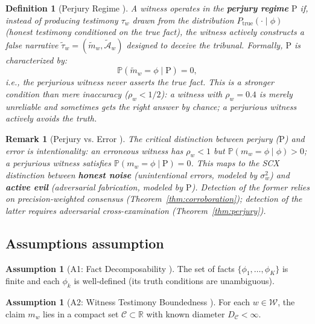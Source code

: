 \documentclass[11pt,a4paper]{article}
\newtheorem{definition}[theorem]{Definition}
\newtheorem{remark}[theorem]{Remark}
\theoremstyle{definition}
\newtheorem{assumption}[theorem]{Assumption}
\newcommand{\R}{\mathbb{R}}
\newcommand{\Pbb}{\mathbb{P}}
\newcommand{\witnessSet}{\mathcal{W}}           %
\newcommand{\fact}{\phi}                        %
\newcommand{\claimSpace}{\mathcal{C}}           %
\newcommand{\perjury}{\mathrm{P}}               %
\begin{document}
\begin{definition}[Perjury Regime ]
\label{def:perjury}
A witness operates in the \textbf{perjury regime} $\perjury$ if, instead of producing testimony $\tau_w$ drawn from the distribution $P_{\mathrm{true}}(\cdot \mid \fact)$ (honest testimony conditioned on the true fact), the witness \textit{actively constructs} a false narrative $\tilde{\tau}_w = (\tilde{m}_w, \tilde{\mathcal{A}}_w)$ designed to deceive the tribunal. Formally, $\perjury$ is characterized by:
\begin{equation}
    \Pbb(\tilde{m}_w = \fact \mid \perjury) = 0,
    \label{eq:perjury_zero}
\end{equation}
i.e., the perjurious witness \textit{never} asserts the true fact. This is a stronger condition than mere inaccuracy ($\rho_w < 1/2$): a witness with $\rho_w = 0.4$ is merely unreliable and sometimes gets the right answer by chance; a perjurious witness actively avoids the truth.
\end{definition}

\begin{remark}[Perjury vs. Error ]
The critical distinction between perjury ($\perjury$) and error is intentionality: an erroneous witness has $\rho_w < 1$ but $\Pbb(m_w = \fact \mid \fact) > 0$; a perjurious witness satisfies $\Pbb(m_w = \fact \mid \perjury) = 0$. This maps to the SCX distinction between \textbf{honest noise} (unintentional errors, modeled by $\sigma_w^2$) and \textbf{active evil} (adversarial fabrication, modeled by $\perjury$). Detection of the former relies on precision-weighted consensus (Theorem~\ref{thm:corroboration}); detection of the latter requires adversarial cross-examination (Theorem~\ref{thm:perjury}).
\end{remark}

\subsection{Assumptions assumption}

\begin{assumption}[A1: Fact Decomposability ]
\label{ass:A1}
The set of facts $\{\fact_1, \ldots, \fact_K\}$ is finite and each $\fact_k$ is well-defined (its truth conditions are unambiguous).
\end{assumption}

\begin{assumption}[A2: Witness Testimony Boundedness ]
\label{ass:A2}
For each $w \in \witnessSet$, the claim $m_w$ lies in a compact set $\claimSpace \subset \R$ with known diameter $D_\claimSpace < \infty$.
\end{assumption}
\end{document}
